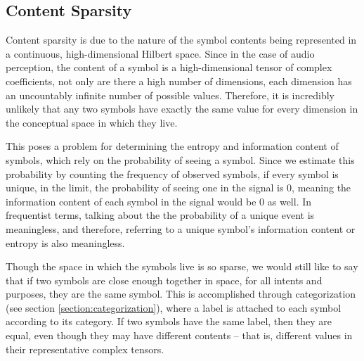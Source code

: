 \subsection{Content Sparsity}
\label{section:content-sparsity}

Content sparsity is due to the nature of the symbol contents being represented in a continuous, high-dimensional Hilbert space.  Since in the case of audio perception, the content of a symbol is a high-dimensional tensor of complex coefficients, not only are there a high number of dimensions, each dimension has an uncountably infinite number of possible values.  Therefore, it is incredibly unlikely that any two symbols have exactly the same value for every dimension in the conceptual space in which they live.

This poses a problem for determining the entropy and information content of symbols, which rely on the probability of seeing a symbol.  Since we estimate this probability by counting the frequency of observed symbols, if every symbol is unique, in the limit, the probability of seeing one in the signal is 0, meaning the information content of each symbol in the signal would be 0 as well.  In frequentist terms, talking about the the probability of a unique event is meaningless, and therefore, referring to a unique symbol's information content or entropy is also meaningless.

Though the space in which the symbols live is so sparse, we would still like to say that if two symbols are close enough together in space, for all intents and purposes, they are the same symbol.  This is accomplished through categorization (see section \ref{section:categorization}), where a label is attached to each symbol according to its category.  If two symbols have the same label, then they are equal, even though they may have different contents -- that is, different values in their representative complex tensors.

